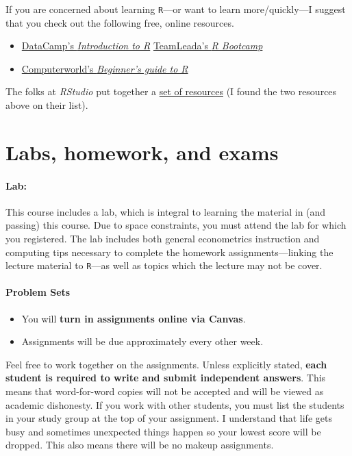 \documentclass[10pt]{article}
\begin{document}
If you are concerned about learning \texttt{R}---or want to learn more/quickly---I suggest that you check out the following free, online resources.
\begin{itemize}
  \item \href{https://www.datacamp.com/courses/free-introduction-to-r}{DataCamp's \emph{Introduction to R}}
  \href{https://www.teamleada.com/courses/r-bootcamp}{TeamLeada's \emph{R Bootcamp}}
  \item \href{https://www.computerworld.com/article/2497143/business-intelligence-beginner-s-guide-to-r-introduction.html}{Computerworld's \textit{Beginner's guide to R}}
\end{itemize}
The folks at \emph{RStudio} put together a  \href{https://www.rstudio.com/online-learning/}{set of resources} (I found the two resources above on their list).

\section*{Labs, homework, and exams}

\paragraph{Lab:} This course includes a lab, which is integral to learning the material in (and passing) this course. Due to space constraints, you must attend the lab for which you registered. The lab includes both general econometrics instruction and computing tips necessary to complete the homework assignments---linking the lecture material to \texttt{R}---as well as topics which the lecture may not be cover.

\paragraph{Problem Sets}
\begin{itemize}
  \item You will \textbf{turn in assignments online via Canvas}.
  \item Assignments will be due approximately every other week.
\end{itemize}
Feel free to work together on the assignments. Unless explicitly stated, \textbf{each student is required to write and submit independent answers}. This means that word-for-word copies will not be accepted and will be viewed as academic dishonesty. If you work with other students, you must list the students in your study group at the top of your assignment. I understand that life gets busy and sometimes unexpected things happen so your lowest score will be dropped. This also means there will be no makeup assignments.
\end{document}

